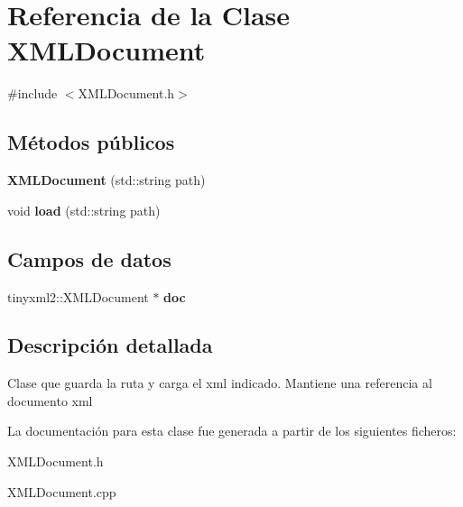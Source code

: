\hypertarget{classXMLDocument}{}\section{Referencia de la Clase X\+M\+L\+Document}
\label{classXMLDocument}


{\ttfamily \#include $<$X\+M\+L\+Document.\+h$>$}

\subsection*{Métodos públicos}
\begin{DoxyCompactItemize}
\item 
\hypertarget{classXMLDocument_ac4601e30f22dcfdb9aa03e9eaab4aacf}{}{\bfseries X\+M\+L\+Document} (std\+::string path)\label{classXMLDocument_ac4601e30f22dcfdb9aa03e9eaab4aacf}

\item 
\hypertarget{classXMLDocument_a6b64e627dfc7785ffe36036bc225bdd6}{}void {\bfseries load} (std\+::string path)\label{classXMLDocument_a6b64e627dfc7785ffe36036bc225bdd6}

\end{DoxyCompactItemize}
\subsection*{Campos de datos}
\begin{DoxyCompactItemize}
\item 
\hypertarget{classXMLDocument_a0f0eeb9266dd8442766fcd435dd1c8f3}{}tinyxml2\+::\+X\+M\+L\+Document $\ast$ {\bfseries doc}\label{classXMLDocument_a0f0eeb9266dd8442766fcd435dd1c8f3}

\end{DoxyCompactItemize}


\subsection{Descripción detallada}
Clase que guarda la ruta y carga el xml indicado. Mantiene una referencia al documento xml 

La documentación para esta clase fue generada a partir de los siguientes ficheros\+:\begin{DoxyCompactItemize}
\item 
X\+M\+L\+Document.\+h\item 
X\+M\+L\+Document.\+cpp\end{DoxyCompactItemize}

